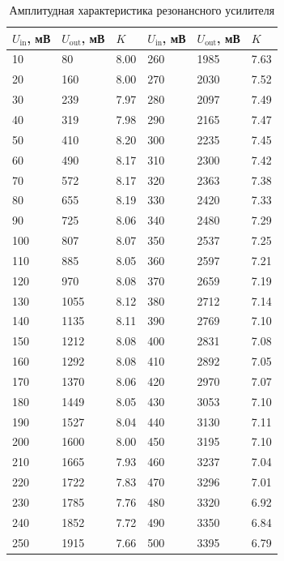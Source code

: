\documentclass[a4paper,12pt]{article}
\begin{document}
\begin{table}[!h]
    \centering
    \caption{Амплитудная характеристика резонансного усилителя}
    \label{tab:data-6-1-3}
    \begin{tabular}{l|l|l||l|l|l}
        \hline
        $U_\text{in}$, мВ & $U_\text{out}$, мВ & $K$ & $U_\text{in}$, мВ & $U_\text{out}$, мВ & $K$ \\ \hline
        10 & 80 & 8.00 & 260 & 1985 & 7.63 \\
        20 & 160 & 8.00 & 270 & 2030 & 7.52 \\
        30 & 239 & 7.97 & 280 & 2097 & 7.49 \\
        40 & 319 & 7.98 & 290 & 2165 & 7.47 \\
        50 & 410 & 8.20 & 300 & 2235 & 7.45 \\
        60 & 490 & 8.17 & 310 & 2300 & 7.42 \\
        70 & 572 & 8.17 & 320 & 2363 & 7.38 \\
        80 & 655 & 8.19 & 330 & 2420 & 7.33 \\
        90 & 725 & 8.06 & 340 & 2480 & 7.29 \\
        100 & 807 & 8.07 & 350 & 2537 & 7.25 \\
        110 & 885 & 8.05 & 360 & 2597 & 7.21 \\
        120 & 970 & 8.08 & 370 & 2659 & 7.19 \\
        130 & 1055 & 8.12 & 380 & 2712 & 7.14 \\
        140 & 1135 & 8.11 & 390 & 2769 & 7.10 \\
        150 & 1212 & 8.08 & 400 & 2831 & 7.08 \\
        160 & 1292 & 8.08 & 410 & 2892 & 7.05 \\
        170 & 1370 & 8.06 & 420 & 2970 & 7.07 \\
        180 & 1449 & 8.05 & 430 & 3053 & 7.10 \\
        190 & 1527 & 8.04 & 440 & 3130 & 7.11 \\
        200 & 1600 & 8.00 & 450 & 3195 & 7.10 \\
        210 & 1665 & 7.93 & 460 & 3237 & 7.04 \\
        220 & 1722 & 7.83 & 470 & 3296 & 7.01 \\
        230 & 1785 & 7.76 & 480 & 3320 & 6.92 \\
        240 & 1852 & 7.72 & 490 & 3350 & 6.84 \\
        250 & 1915 & 7.66 & 500 & 3395 & 6.79 \\ \hline
    \end{tabular}
\end{table}
\end{document}
